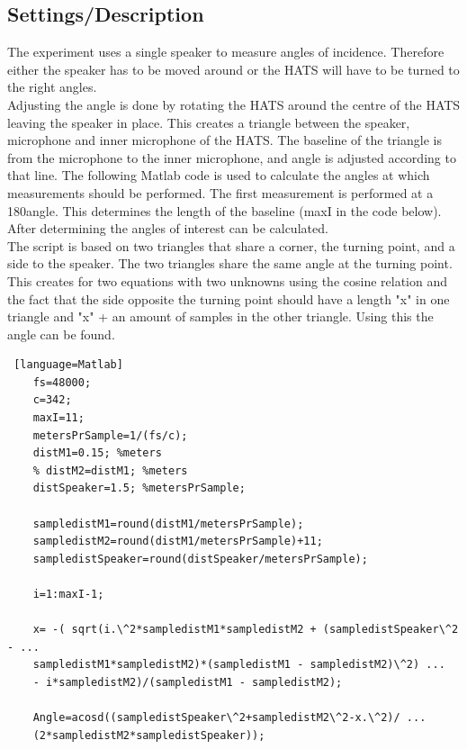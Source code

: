 \subsection{Settings/Description}
The experiment uses a single speaker to measure angles of incidence. Therefore either the speaker has to be moved around or the HATS will have to be turned to the right angles. \\
Adjusting the angle is done by rotating the HATS around the centre of the HATS leaving the speaker in place. This creates a triangle between the speaker, microphone and inner microphone of the HATS. The baseline of the triangle is from the microphone to the inner microphone, and angle is adjusted according to that line. 
The following Matlab code is used to calculate the angles at which measurements should be performed. The first measurement is performed at a 180\textdegree angle. This determines the length of the baseline (maxI in the code below). After determining the angles of interest can be calculated.  \\
The script is based on two triangles that share a corner, the turning point, and a side to the speaker. The two triangles share the same angle at the turning point. This creates for two equations with two unknowns using the cosine relation and the fact that the side opposite the turning point should have a length "x" in one triangle and "x" + an amount of samples in the other triangle. Using this the angle can  be found.  

\begin{lstlisting} [language=Matlab]
	fs=48000;
	c=342;
	maxI=11;
	metersPrSample=1/(fs/c);
	distM1=0.15; %meters
	% distM2=distM1; %meters
	distSpeaker=1.5; %metersPrSample;
	
	sampledistM1=round(distM1/metersPrSample);
	sampledistM2=round(distM1/metersPrSample)+11;
	sampledistSpeaker=round(distSpeaker/metersPrSample);
	
	i=1:maxI-1;
	
	x= -( sqrt(i.\^2*sampledistM1*sampledistM2 + (sampledistSpeaker\^2 - ...
	sampledistM1*sampledistM2)*(sampledistM1 - sampledistM2)\^2) ...
	- i*sampledistM2)/(sampledistM1 - sampledistM2);
	
	Angle=acosd((sampledistSpeaker\^2+sampledistM2\^2-x.\^2)/ ...
	(2*sampledistM2*sampledistSpeaker));
\end{lstlisting}

